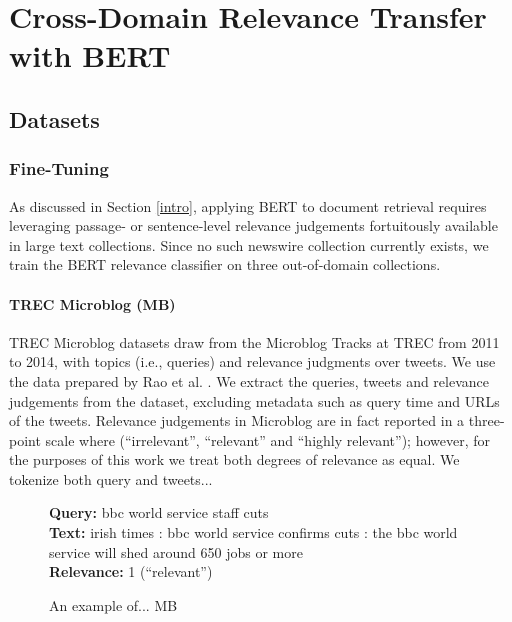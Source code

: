\chapter{Cross-Domain Relevance Transfer with BERT}

\section{Datasets}





\subsection{Fine-Tuning}

As discussed in Section \ref{intro}, applying BERT to document retrieval requires leveraging passage- or sentence-level relevance judgements fortuitously available in large text collections.
Since no such newswire collection currently exists, we train the BERT relevance classifier on three out-of-domain collections.

\subsubsection{TREC Microblog (MB)}

TREC Microblog datasets draw from the Microblog Tracks at TREC from 2011 to 2014, with topics (i.e., queries) and relevance judgments over tweets.
We use the data prepared by Rao et al. \cite{rao2019tweet}.
We extract the queries, tweets and relevance judgements from the dataset, excluding metadata such as query time and URLs of the tweets.
Relevance judgements in Microblog are in fact reported in a three-point scale where (``irrelevant'', ``relevant'' and ``highly relevant''); however, for the purposes of this work we treat both degrees of relevance as equal.
We tokenize both query and tweets...

\begin{figure}[b!]
	\begin{framed}
		\centering
    		\textbf{Query:} bbc world service staff cuts \\
    		\textbf{Text:} irish times : bbc world service confirms cuts : the bbc world service will shed around 650 jobs or more \\
    		\textbf{Relevance:} 1 (``relevant'')
	\end{framed}
\label{mb-example}
 \caption{An example of... MB}
\end{figure}

